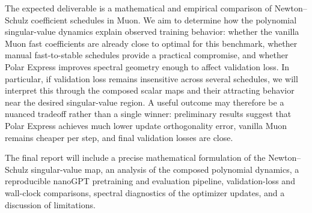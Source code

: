 \documentclass[10pt]{article}
\begin{document}
The expected deliverable is a mathematical and empirical comparison of Newton--Schulz coefficient schedules in Muon. We aim to determine how the polynomial singular-value dynamics explain observed training behavior: whether the vanilla Muon fast coefficients are already close to optimal for this benchmark, whether manual fast-to-stable schedules provide a practical compromise, and whether Polar Express improves spectral geometry enough to affect validation loss. In particular, if validation loss remains insensitive across several schedules, we will interpret this through the composed scalar maps and their attracting behavior near the desired singular-value region. A useful outcome may therefore be a nuanced tradeoff rather than a single winner: preliminary results suggest that Polar Express achieves much lower update orthogonality error, vanilla Muon remains cheaper per step, and final validation losses are close.

The final report will include a precise mathematical formulation of the Newton--Schulz singular-value map, an analysis of the composed polynomial dynamics, a reproducible nanoGPT pretraining and evaluation pipeline, validation-loss and wall-clock comparisons, spectral diagnostics of the optimizer updates, and a discussion of limitations.

\begingroup
\footnotesize
\setlength{\bibsep}{2pt}


\endgroup
\end{document}

